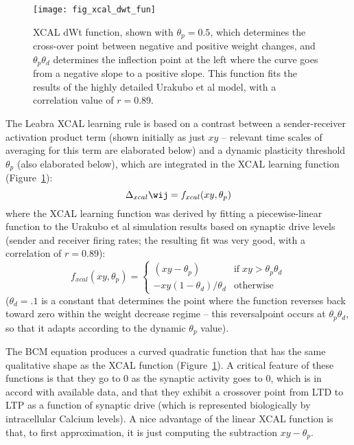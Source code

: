 \begin{figure}[ht!]
 \centering\texttt{[image: fig\_xcal\_dwt\_fun]}
 \caption{\small XCAL dWt function, shown with $\theta_p=0.5$, which determines
   the cross-over point between negative and positive weight changes, and
   $\theta_p \theta_d$ determines the inflection point at the left where the
   curve goes from a negative slope to a positive slope. This function fits
   the results of the highly detailed Urakubo et al \protect
   \cite{UrakuboHondaFroemkeEtAl08} model, with a correlation value of
   $r=0.89$.}
 \label{fig.xcal_dwt}
\end{figure}

The Leabra XCAL learning rule is based on a contrast between a sender-receiver activation product term (shown initially as just $xy$ -- relevant time scales of averaging for this term are elaborated below) and a dynamic plasticity threshold $\theta_p$ (also elaborated below), which are integrated in the XCAL learning function (Figure~\ref{fig.xcal_dwt}):
\begin{equation}
 \Delta_{xcal} \wij = f_{xcal} ( xy, \theta_p)
 \label{eq.xcal_simp}
\end{equation}
where the XCAL learning function was derived by fitting a piecewise-linear function to the Urakubo et al \cite{UrakuboHondaFroemkeEtAl08} simulation results based on synaptic drive levels (sender and receiver firing rates; the resulting fit was very good, with a correlation of $r=0.89$):
\begin{equation}
f_{xcal}(xy, \theta_p) = \left\{ \begin{array}{ll}
(xy - \theta_p) & \mbox{if} \; xy > \theta_p \theta_d \\
-xy (1 - \theta_d) / \theta_d & \mbox{otherwise} \end{array} \right.
\end{equation}
($\theta_d = .1$ is a constant that determines the point where the function reverses back toward zero within the weight decrease regime -- this reversalpoint occurs at $\theta_p \theta_d$, so that it adapts according to the dynamic $\theta_p$ value).

The BCM equation produces a curved quadratic function that has the same qualitative shape as the XCAL function (Figure~\ref{fig.xcal_dwt}). A critical feature of these functions is that they go to 0 as the synaptic activity goes to 0, which is in accord with available data, and that they exhibit a crossover point from LTD to LTP as a function of synaptic drive (which is represented biologically by intracellular Calcium levels). A nice advantage of the linear XCAL function is that, to first approximation, it is just computing the subtraction $xy - \theta_p$.

